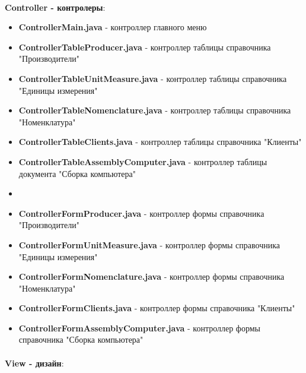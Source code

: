 \documentclass[12pt, a4paper, simple]{eskdtext}
\begin{document}
    \paragraph{} \textbf{Controller - контролеры}:

    \begin{itemize}
        \item \textbf{ControllerMain.java} - контроллер главного меню
        \item \textbf{ControllerTableProducer.java} - контроллер таблицы справочника "Производители"
        \item \textbf{ControllerTableUnitMeasure.java} - контроллер таблицы справочника "Единицы измерения"
        \item \textbf{ControllerTableNomenclature.java} - контроллер таблицы справочника "Номенклатура"
        \item \textbf{ControllerTableClients.java} - контроллер таблицы справочника "Клиенты"
        \item \textbf{ControllerTableAssemblyComputer.java} - контроллер таблицы документа "Сборка компьютера"
        \item[] \hspace{0pt}
        \item \textbf{ControllerFormProducer.java} - контроллер формы справочника "Производители"
        \item \textbf{ControllerFormUnitMeasure.java} - контроллер формы справочника "Единицы измерения"
        \item \textbf{ControllerFormNomenclature.java} - контроллер формы справочника "Номенклатура"
        \item \textbf{ControllerFormClients.java} - контроллер формы справочника "Клиенты"
        \item \textbf{ControllerFormAssemblyComputer.java} - контроллер формы справочника "Сборка компьютера"
    \end{itemize}

    \paragraph{} \textbf{View - дизайн}:
\end{document}
